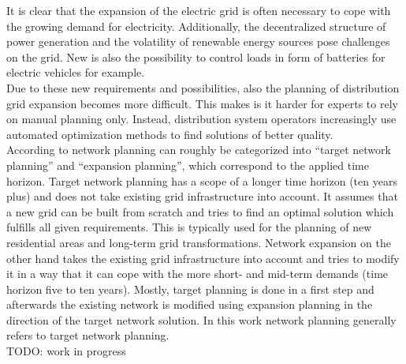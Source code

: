 It is clear that the expansion of the electric grid is often necessary to cope with the growing demand for electricity. Additionally, the decentralized structure of power generation and the volatility of renewable energy sources pose challenges on the grid. New is also the possibility to control loads in form of batteries for electric vehicles for example. \\
Due to these new requirements and possibilities, also the planning of distribution grid expansion becomes more difficult. This makes is it harder for experts to rely on manual planning only. Instead, distribution system operators increasingly use automated optimization methods to find solutions of better quality. \\
According to \cite{rotering2013zielnetzplanung} network planning can roughly be categorized into “target network planning” and “expansion planning”, which correspond to the applied time horizon. Target network planning has a scope of a longer time horizon (ten years plus) and does not take existing grid infrastructure into account. It assumes that a new grid can be built from scratch and tries to find an optimal solution which fulfills all given requirements. This is typically used for the planning of new residential areas and long-term grid transformations. Network expansion on the other hand takes the existing grid infrastructure into account and tries to modify it in a way that it can cope with the more short- and mid-term demands (time horizon five to ten years). Mostly, target planning is done in a first step and afterwards the existing network is modified using expansion planning in the direction of the target network solution. In this work network planning generally refers to target network planning.\\

TODO: work in progress
